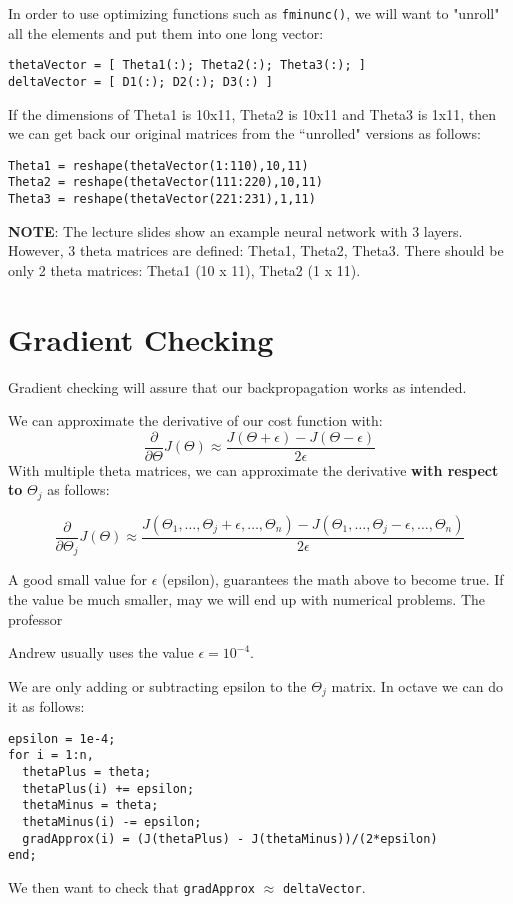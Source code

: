 In order to use optimizing functions such as \verb|fminunc()|, we will want to "unroll" all the elements and put them into one long vector:
\begin{verbatim}
thetaVector = [ Theta1(:); Theta2(:); Theta3(:); ]
deltaVector = [ D1(:); D2(:); D3(:) ]
\end{verbatim}
If the dimensions of Theta1 is 10x11, Theta2 is 10x11 and Theta3 is 1x11, then we can get back our original matrices from the ``unrolled" versions as follows:

\begin{verbatim}
Theta1 = reshape(thetaVector(1:110),10,11)
Theta2 = reshape(thetaVector(111:220),10,11)
Theta3 = reshape(thetaVector(221:231),1,11)
\end{verbatim}
\textbf{NOTE}: The lecture slides show an example neural network with 3 layers. However, 3 theta matrices are defined: Theta1, Theta2, Theta3. There should be only 2 theta matrices: Theta1 (10 x 11), Theta2 (1 x 11).

\section{Gradient Checking}
Gradient checking will assure that our backpropagation works as intended.

We can approximate the derivative of our cost function with:
\[\dfrac{\partial}{\partial\Theta}J(\Theta) \approx \dfrac{J(\Theta + \epsilon) - J(\Theta - \epsilon)}{2\epsilon}\]
With multiple theta matrices, we can approximate the derivative \textbf{with respect to} $\Theta_j$ as follows:

\[\dfrac{\partial}{\partial\Theta_j}J(\Theta) \approx \dfrac{J(\Theta_1, \dots, \Theta_j + \epsilon, \dots, \Theta_n) - J(\Theta_1, \dots, \Theta_j - \epsilon, \dots, \Theta_n)}{2\epsilon} \]

A good small value for $\epsilon$ (epsilon), guarantees the math above to become true. If the value be much smaller, may we will end up with numerical problems. The professor 

Andrew usually uses the value $\epsilon = 10^{-4}$.

We are only adding or subtracting epsilon to the $\Theta_j$ matrix. In octave we can do it as follows:
\begin{verbatim}
epsilon = 1e-4;
for i = 1:n,
  thetaPlus = theta;
  thetaPlus(i) += epsilon;
  thetaMinus = theta;
  thetaMinus(i) -= epsilon;
  gradApprox(i) = (J(thetaPlus) - J(thetaMinus))/(2*epsilon)
end;
\end{verbatim}
We then want to check that \verb|gradApprox| $\approx$ \verb|deltaVector|.

